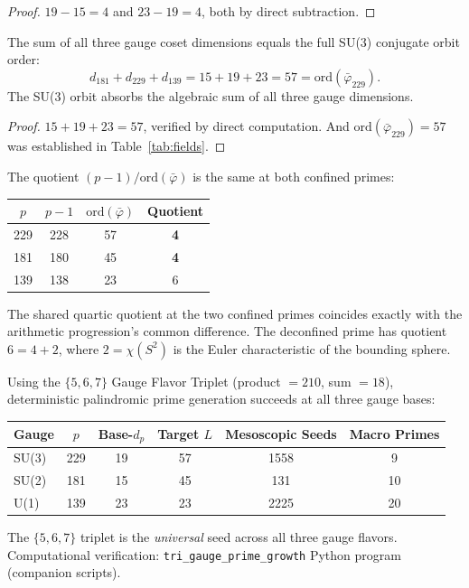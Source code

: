 \begin{proof}
$19 - 15 = 4$ and $23 - 19 = 4$, both by direct subtraction. \qedhere
\end{proof}

\begin{theorem}
\label{thm:master_sum}
The sum of all three gauge coset dimensions equals the full SU(3) conjugate orbit order:
\[
d_{181} + d_{229} + d_{139} = 15 + 19 + 23 = 57 = \mathrm{ord}(\bar\varphi_{229}).
\]
The SU(3) orbit absorbs the algebraic sum of all three gauge dimensions.
\end{theorem}

\begin{proof}
$15 + 19 + 23 = 57$, verified by direct computation. And $\mathrm{ord}(\bar\varphi_{229}) = 57$ was established in Table~\ref{tab:fields}. \qedhere
\end{proof}

\begin{result}
The quotient $(p - 1)/\mathrm{ord}(\bar\varphi)$ is the same at both confined primes:
\begin{center}
\begin{tabular}{@{}cccc@{}}
\toprule
$p$ & $p-1$ & $\mathrm{ord}(\bar\varphi)$ & Quotient \\
\midrule
229 & 228 & 57 & \textbf{4} \\
181 & 180 & 45 & \textbf{4} \\
139 & 138 & 23 & 6 \\
\bottomrule
\end{tabular}
\end{center}
The shared quartic quotient at the two confined primes coincides exactly with the arithmetic progression's common difference. The deconfined prime has quotient $6 = 4 + 2$, where $2 = \chi(S^2)$ is the Euler characteristic of the bounding sphere.
\end{result}

\begin{result}
\label{res:tri_gauge_primes}
Using the $\{5, 6, 7\}$ Gauge Flavor Triplet (product $= 210$, sum $= 18$), deterministic palindromic prime generation succeeds at all three gauge bases:
\begin{center}
\begin{tabular}{@{}lccccc@{}}
\toprule
Gauge & $p$ & Base-$d_p$ & Target $L$ & Mesoscopic Seeds & Macro Primes \\
\midrule
SU(3) & 229 & 19 & 57 & 1558 & 9 \\
SU(2) & 181 & 15 & 45 & 131 & 10 \\
U(1) & 139 & 23 & 23 & 2225 & 20 \\
\bottomrule
\end{tabular}
\end{center}
The $\{5, 6, 7\}$ triplet is the \emph{universal} seed across all three gauge flavors. Computational verification: \texttt{tri\_gauge\_prime\_growth} Python program (companion scripts).
\end{result}

